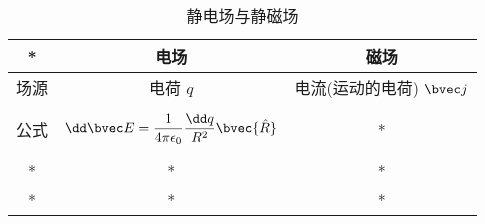 
\begin{issues}
\issueDraft
\end{issues}

\begin{table}[ht]
\centering
\caption{静电场与静磁场}\label{tab_estfid1}
\begin{tabular}{|c|c|c|}
\hline
* & 电场 & 磁场 \\
\hline
场源 & 电荷 $q$ & 电流(运动的电荷) $\bvec j$ \\
\hline
公式 & $$\dd \bvec E = \frac{1}{4 \pi \epsilon_0} \frac{\dd q}{R^2} \bvec {\hat R} $$ & * \\
\hline
* & * & * \\
\hline
* & * & * \\
\hline
\end{tabular}
\end{table}
